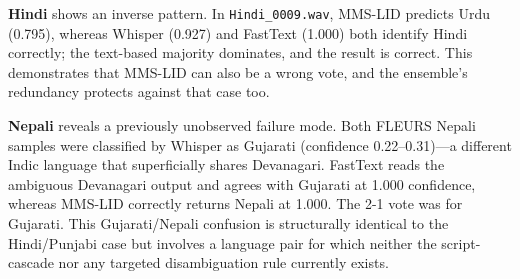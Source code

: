\documentclass[12pt, onecolumn]{IEEEtran}
\begin{document}
\textbf{Hindi} shows an inverse pattern. In \texttt{Hindi\_0009.wav}, MMS-LID predicts Urdu (0.795), whereas Whisper (0.927) and FastText (1.000) both identify Hindi correctly; the text-based majority dominates, and the result is correct. This demonstrates that MMS-LID can also be a wrong vote, and the ensemble's redundancy protects against that case too.

\textbf{Nepali} reveals a previously unobserved failure mode. Both FLEURS Nepali samples were classified by Whisper as Gujarati (confidence 0.22--0.31)---a different Indic language that superficially shares Devanagari. FastText reads the ambiguous Devanagari output and agrees with Gujarati at 1.000 confidence, whereas MMS-LID correctly returns Nepali at 1.000. The 2-1 vote was for Gujarati. This Gujarati/Nepali confusion is structurally identical to the Hindi/Punjabi case but involves a language pair for which neither the script-cascade nor any targeted disambiguation rule currently exists.
\end{document}
